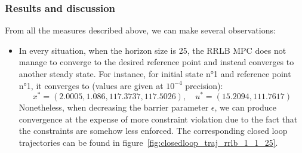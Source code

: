 \documentclass[12pt]{article}
\begin{document}
\subsubsection{Results and discussion}\label{sec:results-discussion}

\noindent From all the measures described above, we can make several observations:

\begin{itemize}[label=\textbullet]
	\item In every situation, when the horizon size is 25, the RRLB MPC does not manage to converge to the desired reference point and instead converges to another steady state.
	For instance, for initial state n°1 and reference point n°1, it converges to (values are given at $10^{-4}$ precision):
	$$x^*=(2.0005, 1.086, 117.3737, 117.5026),\quad u^*=(15.2094, 111.7617)$$
	Nonetheless, when decreasing the barrier parameter $\epsilon$, we can produce convergence at the expense of more constraint violation due to the fact that the constraints are somehow less enforced.
	The corresponding closed loop trajectories can be found in figure~\ref{fig:closedloop_traj_rrlb_1_1_25}.


\end{itemize}
\end{document}
